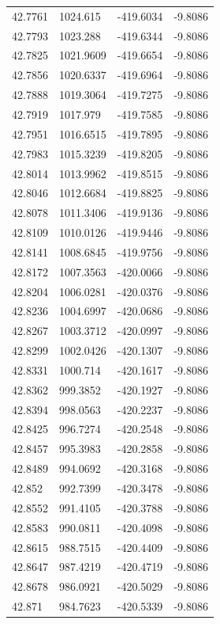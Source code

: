 \begin{table}[H]
\begin{tabular}{llll}
42.7761 & 1024.615 & -419.6034 & -9.8086 \\
42.7793 & 1023.288 & -419.6344 & -9.8086 \\
42.7825 & 1021.9609 & -419.6654 & -9.8086 \\
42.7856 & 1020.6337 & -419.6964 & -9.8086 \\
42.7888 & 1019.3064 & -419.7275 & -9.8086 \\
42.7919 & 1017.979 & -419.7585 & -9.8086 \\
42.7951 & 1016.6515 & -419.7895 & -9.8086 \\
42.7983 & 1015.3239 & -419.8205 & -9.8086 \\
42.8014 & 1013.9962 & -419.8515 & -9.8086 \\
42.8046 & 1012.6684 & -419.8825 & -9.8086 \\
42.8078 & 1011.3406 & -419.9136 & -9.8086 \\
42.8109 & 1010.0126 & -419.9446 & -9.8086 \\
42.8141 & 1008.6845 & -419.9756 & -9.8086 \\
42.8172 & 1007.3563 & -420.0066 & -9.8086 \\
42.8204 & 1006.0281 & -420.0376 & -9.8086 \\
42.8236 & 1004.6997 & -420.0686 & -9.8086 \\
42.8267 & 1003.3712 & -420.0997 & -9.8086 \\
42.8299 & 1002.0426 & -420.1307 & -9.8086 \\
42.8331 & 1000.714 & -420.1617 & -9.8086 \\
42.8362 & 999.3852 & -420.1927 & -9.8086 \\
42.8394 & 998.0563 & -420.2237 & -9.8086 \\
42.8425 & 996.7274 & -420.2548 & -9.8086 \\
42.8457 & 995.3983 & -420.2858 & -9.8086 \\
42.8489 & 994.0692 & -420.3168 & -9.8086 \\
42.852 & 992.7399 & -420.3478 & -9.8086 \\
42.8552 & 991.4105 & -420.3788 & -9.8086 \\
42.8583 & 990.0811 & -420.4098 & -9.8086 \\
42.8615 & 988.7515 & -420.4409 & -9.8086 \\
42.8647 & 987.4219 & -420.4719 & -9.8086 \\
42.8678 & 986.0921 & -420.5029 & -9.8086 \\
42.871 & 984.7623 & -420.5339 & -9.8086 \\

\end{tabular}
\end{table}
